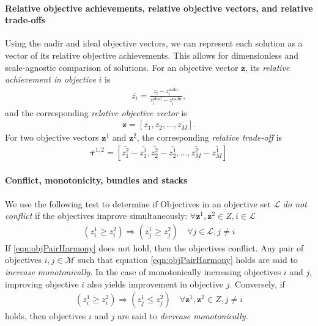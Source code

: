 \paragraph{Relative objective achievements, relative objective vectors, and relative trade-offs}
Using the nadir and ideal objective vectors, we can represent each solution as a vector of its relative objective achievements. This allows for dimensionless and scale-agnostic comparison of solutions. For an objective vector $\mathbf{z}$, its \textit{relative achievement in objective} $i$ is
\begin{align}
\overbar{z_i} = \frac{z_i - z^\text{nadir}_i}{z^\text{ideal}_i - z^\text{nadir}_i},
\end{align}
and the corresponding \textit{relative objective vector} is
\begin{align}
\overbar{\mathbf{z}} = [\overbar{z_1},\overbar{z_2},\ldots,\overbar{z_M}].
\end{align}
For two objective vectors $\mathbf{z}^1$ and $\mathbf{z}^2$, the corresponding \textit{relative trade-off} is
\begin{align}
\overbar{\mathbf{\tau}}^{1,2} = \left[\overbar{z^2_1} - \overbar{z^1_1}, \overbar{z^2_2} - \overbar{z^1_2}, \ldots, \overbar{z^2_M} - \overbar{z^1_M}\right]
\end{align}

\paragraph{Conflict, monotonicity, bundles and stacks}
We use the following test to determine if Objectives in an objective set $\mathcal{L}$ \textit{do not conflict} if the objectives improve simultaneously:
$\forall \mathbf{z}^1, \mathbf{z}^2 \in Z, i \in \mathcal{L}$
\begin{align}
(z^1_i \ge z^2_i) \Rightarrow (z^1_j \ge z^2_j) \quad \forall j \in \mathcal{L}, j \neq i \label{eqn:objPairHarmony}
\end{align}
If \eqref{eqn:objPairHarmony} does not hold, then the objectives conflict. Any pair of objectives $i,j \in \mathcal{M}$ such that equation \eqref{eqn:objPairHarmony} holds are said to \textit{increase monotonically}. In the case of monotonically increasing objectives $i$ and $j$, improving objective $i$ also yields improvement in objective $j$. Conversely, if 
\begin{align}
(z^1_i \ge z^2_i) \Rightarrow (z^1_j \le z^2_j) \quad \forall \mathbf{z}^1, \mathbf{z}^2 \in Z, j \neq i \label{eqn:objPairMonoDec}
\end{align}
holds, then objectives $i$ and $j$ are said to \textit{decrease monotonically}.

